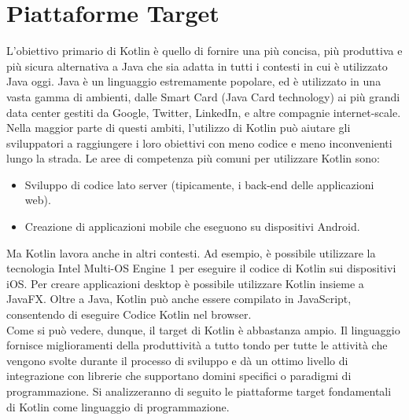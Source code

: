 \section{Piattaforme Target}
L'obiettivo primario di Kotlin è quello di fornire una più concisa, più produttiva e più sicura alternativa a Java che sia adatta in tutti i contesti in cui è utilizzato Java oggi. Java è un linguaggio estremamente popolare, ed è utilizzato in una vasta gamma di ambienti, dalle Smart Card (Java Card technology) ai più grandi data center gestiti da Google, Twitter, LinkedIn, e altre compagnie internet-scale. Nella maggior parte di questi ambiti, l'utilizzo di Kotlin può aiutare gli sviluppatori a raggiungere i loro obiettivi con meno codice e meno inconvenienti lungo la strada. Le aree di competenza più comuni per utilizzare Kotlin sono:
\begin{itemize}
  \item Sviluppo di codice lato server (tipicamente, i back-end delle applicazioni web).
  \item Creazione di applicazioni mobile che eseguono su dispositivi Android.
\end{itemize}
Ma Kotlin lavora anche in altri contesti. Ad esempio, è possibile utilizzare la tecnologia Intel Multi-OS Engine 1 per eseguire il codice di Kotlin sui dispositivi iOS. Per creare applicazioni desktop è possibile utilizzare Kotlin insieme a JavaFX. Oltre a Java, Kotlin può anche essere compilato in JavaScript, consentendo di eseguire Codice Kotlin nel browser.\\
Come si può vedere, dunque, il target di Kotlin è abbastanza ampio. Il linguaggio fornisce miglioramenti della produttività a tutto tondo per tutte le attività che vengono svolte durante il processo di sviluppo e dà un ottimo livello di integrazione con librerie che supportano domini specifici o paradigmi di programmazione. Si analizzeranno di seguito le piattaforme target fondamentali di Kotlin come linguaggio di programmazione.\\

